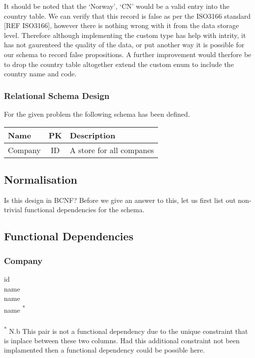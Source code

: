 \documentclass[12pt]{article}
\begin{document}
It should be noted that the `Norway', `CN' would be a valid entry into the country table. We can verify that this record is false as per the ISO3166 standard [REF ISO3166], however there is nothing wrong with it from the data storage level. Therefore although implementing the custom type has help with intrity, it has not gaurenteed the quality of the data, or put another way it is possible for our schema to record false propositions. A further improvement would therfore be to drop the country table altogether extend the custom enum to include the country name and code.

\subsubsection{Relational Schema Design}
For the given problem the following schema has been defined.

\begin{tabular}{l|c|l}
Name&PK&Description\\\hline
Company&ID&A store for all companes\\
\end{tabular}

\subsection{Normalisation}
Is this design in BCNF? Before we give an answer to this, let us first list out non-trivial functional dependencies for the schema.

\subsection{Functional Dependencies}
\subsubsection{Company}

id  \\
name  \\
name  \\
name \not {} \textsuperscript{*} \\

\\ \textsuperscript{*} N.b This pair is not a functional dependency due to the unique constraint that is inplace between these two columns. Had this additional constraint not been implamented then a functional dependency could be possible here.
\end{document}
